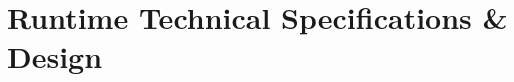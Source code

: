 \documentclass{article}
\begin{document}
\section{Runtime Technical Specifications \& Design}
\end{document}
